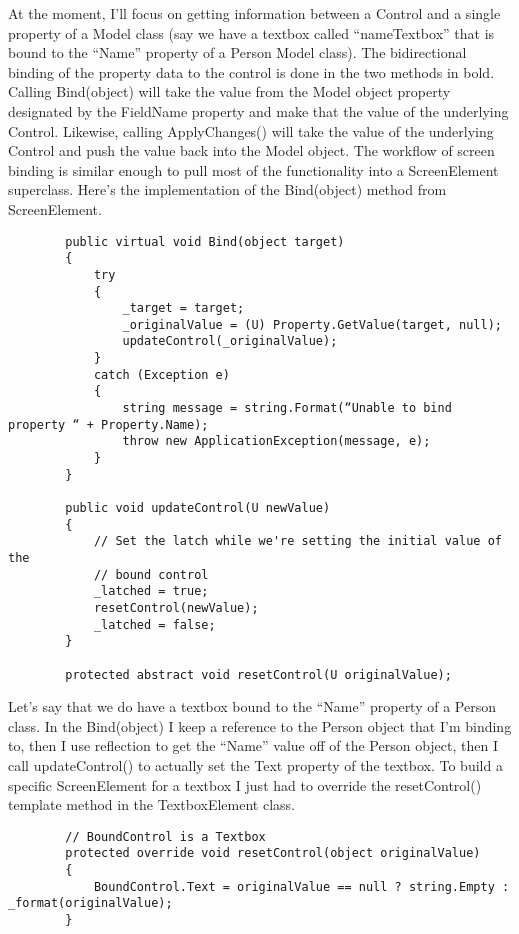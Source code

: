 \documentclass{article}
\begin{document}
{At the moment, I'll focus on getting information between a Control and a single property of a Model class (say we have a textbox called “nameTextbox” that is bound to the “Name” property of a Person Model class).  The bidirectional binding of the property data to the control is done in the two methods in bold.  Calling Bind(object) will take the value from the Model object property designated by the FieldName property and make that the value of the underlying Control.  Likewise, calling ApplyChanges() will take the value of the underlying Control and push the value back into the Model object.  The workflow of screen binding is similar enough to pull most of the functionality into a ScreenElement superclass.  Here's the implementation of the Bind(object) method from ScreenElement.
\newpage
 \begin{lstlisting}
        public virtual void Bind(object target)
        {
            try
            {
                _target = target;
                _originalValue = (U) Property.GetValue(target, null);
                updateControl(_originalValue);
            }
            catch (Exception e)
            {
                string message = string.Format(“Unable to bind property “ + Property.Name);
                throw new ApplicationException(message, e);
            }
        } 

        public void updateControl(U newValue)
        {
            // Set the latch while we're setting the initial value of the 
            // bound control
            _latched = true;
            resetControl(newValue);
            _latched = false;
        }

        protected abstract void resetControl(U originalValue);
\end{lstlisting}

Let's say that we do have a textbox bound to the “Name” property of a Person class.  In the Bind(object) I keep a reference to the Person object that I'm binding to, then I use reflection to get the “Name” value off of the Person object, then I call updateControl() to actually set the Text property of the textbox.  To build a specific ScreenElement for a textbox I just had to override the resetControl() template method in the TextboxElement class.
\begin{lstlisting}
        // BoundControl is a Textbox
        protected override void resetControl(object originalValue)
        {
            BoundControl.Text = originalValue == null ? string.Empty : _format(originalValue);
        }
\end{lstlisting}

}
\end{document}
